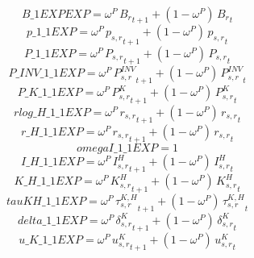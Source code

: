 \begin{dmath*}
B\_1EXPEXP = {{\omega^{P}}}\, {{B_r}}_{t+1}+\left(1-{{\omega^{P}}}\right)\, {{B_r}}_{t}
\end{dmath*}
\begin{dmath*}
p\_1\_1EXP = {{\omega^{P}}}\, {{p_{s,r}}}_{t+1}+\left(1-{{\omega^{P}}}\right)\, {{p_{s,r}}}_{t}
\end{dmath*}
\begin{dmath*}
P\_1\_1EXP = {{\omega^{P}}}\, {{P_{s,r}}}_{t+1}+\left(1-{{\omega^{P}}}\right)\, {{P_{s,r}}}_{t}
\end{dmath*}
\begin{dmath*}
P\_INV\_1\_1EXP = {{\omega^{P}}}\, {{P^{INV}_{s,r}}}_{t+1}+\left(1-{{\omega^{P}}}\right)\, {{P^{INV}_{s,r}}}_{t}
\end{dmath*}
\begin{dmath*}
P\_K\_1\_1EXP = {{\omega^{P}}}\, {{P^K_{s,r}}}_{t+1}+\left(1-{{\omega^{P}}}\right)\, {{P^K_{s,r}}}_{t}
\end{dmath*}
\begin{dmath*}
rlog\_H\_1\_1EXP = {{\omega^{P}}}\, {{r_{s,r}}}_{t+1}+\left(1-{{\omega^{P}}}\right)\, {{r_{s,r}}}_{t}
\end{dmath*}
\begin{dmath*}
r\_H\_1\_1EXP = {{\omega^{P}}}\, {{r_{s,r}}}_{t+1}+\left(1-{{\omega^{P}}}\right)\, {{r_{s,r}}}_{t}
\end{dmath*}
\begin{dmath*}
omegaI\_1\_1EXP = 1
\end{dmath*}
\begin{dmath*}
I\_H\_1\_1EXP = {{\omega^{P}}}\, {{I^H_{s,r}}}_{t+1}+\left(1-{{\omega^{P}}}\right)\, {{I^H_{s,r}}}_{t}
\end{dmath*}
\begin{dmath*}
K\_H\_1\_1EXP = {{\omega^{P}}}\, {{K^H_{s,r}}}_{t+1}+\left(1-{{\omega^{P}}}\right)\, {{K^H_{s,r}}}_{t}
\end{dmath*}
\begin{dmath*}
tauKH\_1\_1EXP = {{\omega^{P}}}\, {{\tau^{K,H}_{s,r}}}_{t+1}+\left(1-{{\omega^{P}}}\right)\, {{\tau^{K,H}_{s,r}}}_{t}
\end{dmath*}
\begin{dmath*}
delta\_1\_1EXP = {{\omega^{P}}}\, {{\delta^{K}_{s,r}}}_{t+1}+\left(1-{{\omega^{P}}}\right)\, {{\delta^{K}_{s,r}}}_{t}
\end{dmath*}
\begin{dmath*}
u\_K\_1\_1EXP = {{\omega^{P}}}\, {{u^K_{s,r}}}_{t+1}+\left(1-{{\omega^{P}}}\right)\, {{u^K_{s,r}}}_{t}
\end{dmath*}
